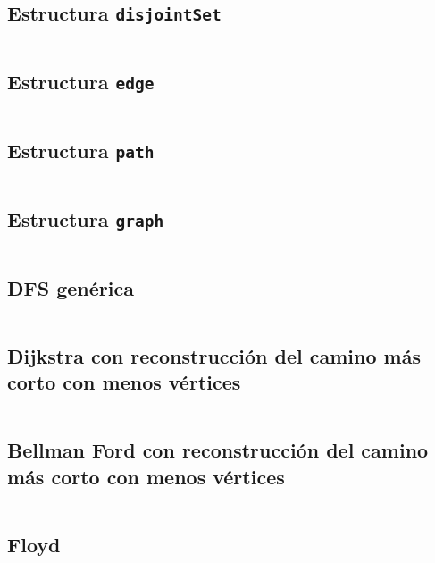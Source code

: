 \documentclass[11pt]{article}
\begin{document}
		\subsection{Estructura \texttt{disjointSet}}
		\inputminted[tabsize=2,breaklines,firstline=8,lastline=37,fontsize=\small]{c++}{graph.cpp}
		
		\subsection{Estructura \texttt{edge}}
		\inputminted[tabsize=2,breaklines,firstline=39,lastline=57,fontsize=\small]{c++}{graph.cpp}
		
		\subsection{Estructura \texttt{path}}
		\inputminted[tabsize=2,breaklines,firstline=59,lastline=64,fontsize=\small]{c++}{graph.cpp}
		
		\subsection{Estructura \texttt{graph}}
		\inputminted[tabsize=2,breaklines,firstline=66,lastline=101,fontsize=\small]{c++}{graph.cpp}
		
		\subsection{DFS genérica}
		\inputminted[tabsize=2,breaklines,firstline=411,lastline=429,fontsize=\small]{c++}{graph.cpp}
		
		\subsection{Dijkstra con reconstrucción del camino más corto con menos vértices}
		\inputminted[tabsize=2,breaklines,firstline=103,lastline=129,fontsize=\small]{c++}{graph.cpp}
		
		\subsection{Bellman Ford con reconstrucción del camino más corto con menos vértices}
		\inputminted[tabsize=2,breaklines,firstline=131,lastline=165,fontsize=\small]{c++}{graph.cpp}
		
		\subsection{Floyd}
		\inputminted[tabsize=2,breaklines,firstline=167,lastline=175,fontsize=\small]{c++}{graph.cpp}
		
\end{document}

